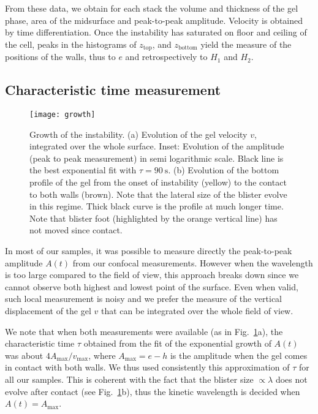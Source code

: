\documentclass[twocolumn,superscriptaddress,showpacs,preprintnumbers,amsmath,amssymb,prl]{revtex4-1}
\begin{document}
From these data, we obtain for each stack the volume and thickness of the gel phase, area of the midsurface and peak-to-peak amplitude. Velocity is obtained by time differentiation. Once the instability has saturated on floor and ceiling of the cell, peaks in the histograms of $z_\text{top}$, and $z_\text{bottom}$ yield the measure of the positions of the walls, thus to $e$ and retrospectively to $H_1$ and $H_2$.

\subsection*{Characteristic time measurement}
\begin{figure}
	\texttt{[image: growth]}
	\caption{Growth of the instability. (a) Evolution of the gel velocity $v$, integrated over the whole surface. Inset: Evolution of the amplitude (peak to peak measurement) in semi logarithmic scale. Black line is the best exponential fit with $\tau=\SI{90}{\second}$. (b) Evolution of the bottom profile of the gel from the onset of instability (yellow) to the contact to both walls (brown). Note that the lateral size of the blister evolve in this regime. Thick black curve is the profile at much longer time. Note that blister foot (highlighted by the orange vertical line) has not moved since contact.}
	\label{fig:growth}
\end{figure}

In most of our samples, it was possible to measure directly the peak-to-peak amplitude $A(t)$ from our confocal measurements. However when the wavelength is too large compared to the field of view, this approach breaks down since we cannot observe both highest and lowest point of the surface. Even when valid, such local measurement is noisy and we prefer the measure of the vertical displacement of the gel $v$ that can be integrated over the whole field of view.

We note that when both measurements were available (as in Fig.~\ref{fig:growth}a), the characteristic time $\tau$ obtained from the fit of the exponential growth of $A(t)$ was about $4A_\text{max}/v_\text{max}$, where $A_\text{max} = e-h$ is the amplitude when the gel comes in contact with both walls. We thus used consistently this approximation of $\tau$ for all our samples. This is coherent with the fact that the blister size $\propto\lambda$ does not evolve after contact (see Fig.~\ref{fig:growth}b), thus the kinetic wavelength is decided when $A(t) = A_\text{max}$.
\end{document}
